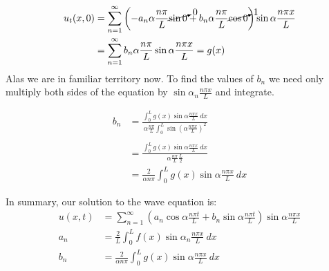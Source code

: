 \begin{align*}
u_t(x,0) &= \sum\limits_{n=1}^{\infty}\left(-a_n\alpha \frac{n \pi}{L} \cancelto{0}{\sin{0}} + b_n\alpha \frac{n \pi}{L} \cancelto{1}{\cos{0}} \right) \sin{\alpha \frac{n \pi x}{L}} \\
&=\sum\limits_{n=1}^{\infty} b_n \alpha \frac{n \pi}{L} \sin{\alpha \frac{n \pi x}{L}} = g(x)
\end{align*}
Alas we are in familiar territory now.  To find the values of $b_n$ we need only multiply both sides of the equation by $\sin{\alpha_n \frac{n \pi x}{L}}$ and integrate.

\begin{align*}
b_n &= \frac{\int_{0}^{L} g(x) \sin{\alpha \frac{n \pi x}{L}} \ dx }{\alpha \frac{n \pi}{L}\int_{0}^{L} \sin{\left(\alpha \frac{n \pi x}{L} \right)}^2} \\
& \\
&= \frac{\int_{0}^{L} g(x) \sin{\alpha \frac{n \pi x}{L}} \ dx }{\alpha \frac{n \pi}{L}\frac{L}{2}} \\
&= \frac{2}{\alpha n \pi} \int_{0}^{L} g(x) \sin{\alpha \frac{n \pi x}{L}} \ dx
\end{align*}  

\vspace{0.25cm}
\noindent In summary, our solution to the wave equation is:
\begin{align*}
u(x,t) &= \sum\limits_{n=1}^{\infty} \left(a_n \cos{\alpha \frac{n \pi t}{L}} + b_n \sin{\alpha \frac{n \pi t}{L}} \right) \sin{\alpha \frac{n \pi x}{L}} \\
a_n &= \frac{2}{L} \int_{0}^{L} f(x) \sin{\alpha_n \frac{n \pi x}{L}} \ dx \\
b_n &= \frac{2}{\alpha n \pi} \int_{0}^{L} g(x) \sin{\alpha \frac{n \pi x}{L}} \ dx
\end{align*}

